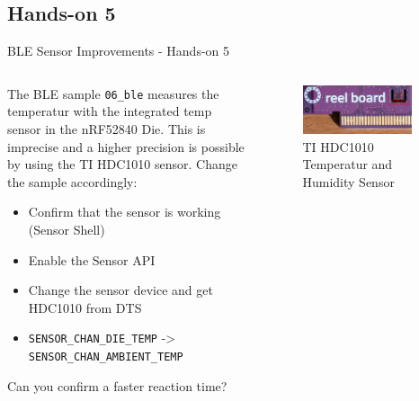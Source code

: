 \documentclass[10pt, aspectratio=169]{beamer}
\begin{document}
\subsection{Hands-on 5}
\begin{frame}[fragile]{BLE Sensor Improvements - Hands-on 5}
  \begin{columns}
    \begin{column}{0.6\textwidth}
       The BLE sample \texttt{06\_ble} measures the temperatur with the
       integrated temp sensor in the nRF52840 Die. This is imprecise and a
       higher precision is possible by using the TI HDC1010 sensor. Change
       the sample accordingly\footnotemark:
       \begin{itemize}
        \item Confirm that the sensor is working (Sensor Shell)
        \item Enable the Sensor API
        \item Change the sensor device and get HDC1010 from DTS
        \item \scriptsize\texttt{SENSOR\_CHAN\_DIE\_TEMP} -> \scriptsize\texttt{SENSOR\_CHAN\_AMBIENT\_TEMP}
       \end{itemize}
       Can you confirm a faster reaction time?
    \end{column}
    \begin{column}{0.4\textwidth}
      \begin{listing}[H]
      \begin{figure}
       \includegraphics[width=0.9\textwidth]{images/reel_board_hdc1010.jpg}
        \caption*{TI HDC1010 Temperatur and Humidity Sensor}
      \end{figure}
      \end{listing}
    \end{column}
  \end{columns}
\end{frame}
\end{document}
